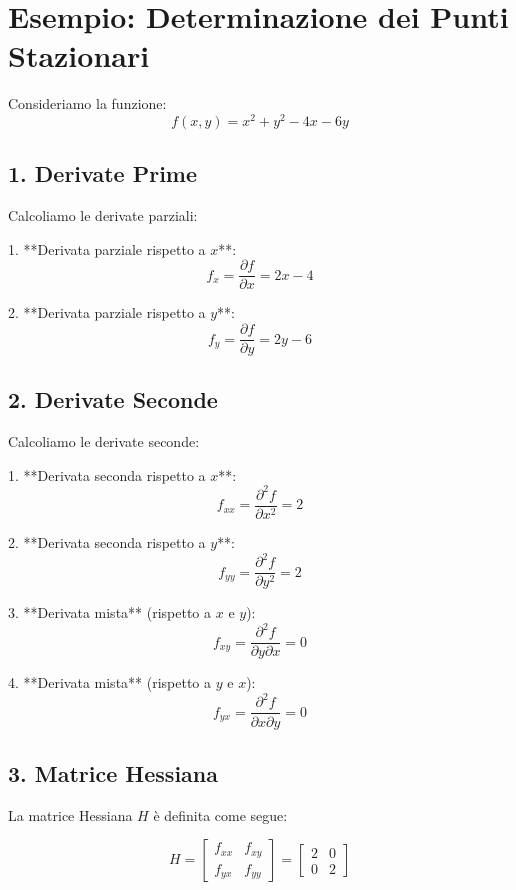 \documentclass{article}
\begin{document}
\section*{Esempio: Determinazione dei Punti Stazionari}

Consideriamo la funzione:
\[
f(x, y) = x^2 + y^2 - 4x - 6y
\]

\subsection*{1. Derivate Prime}

Calcoliamo le derivate parziali:

1. **Derivata parziale rispetto a \( x \)**:
   \[
   f_x = \frac{\partial f}{\partial x} = 2x - 4
   \]

2. **Derivata parziale rispetto a \( y \)**:
   \[
   f_y = \frac{\partial f}{\partial y} = 2y - 6
   \]

\subsection*{2. Derivate Seconde}

Calcoliamo le derivate seconde:

1. **Derivata seconda rispetto a \( x \)**:
   \[
   f_{xx} = \frac{\partial^2 f}{\partial x^2} = 2
   \]

2. **Derivata seconda rispetto a \( y \)**:
   \[
   f_{yy} = \frac{\partial^2 f}{\partial y^2} = 2
   \]

3. **Derivata mista** (rispetto a \( x \) e \( y \)):
   \[
   f_{xy} = \frac{\partial^2 f}{\partial y \partial x} = 0
   \]

4. **Derivata mista** (rispetto a \( y \) e \( x \)):
   \[
   f_{yx} = \frac{\partial^2 f}{\partial x \partial y} = 0
   \]

\subsection*{3. Matrice Hessiana}

La matrice Hessiana \( H \) è definita come segue:

\[
H = \begin{bmatrix}
f_{xx} & f_{xy} \\
f_{yx} & f_{yy}
\end{bmatrix}
= \begin{bmatrix}
2 & 0 \\
0 & 2
\end{bmatrix}
\]
\end{document}
